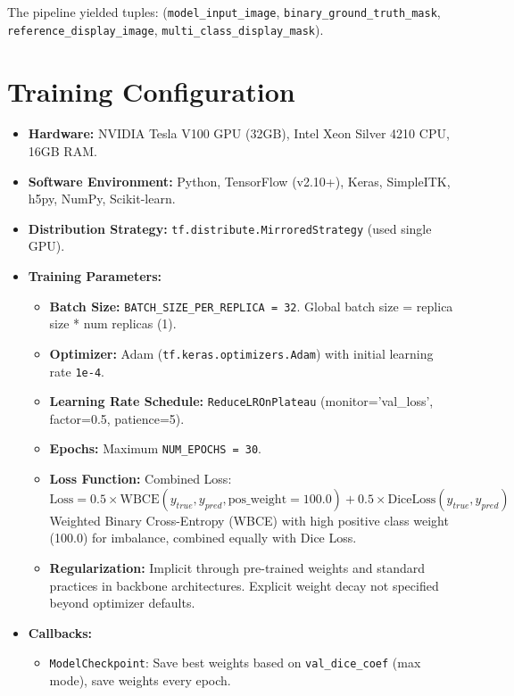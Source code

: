 The pipeline yielded tuples: (\texttt{model\_input\_image}, \texttt{binary\_ground\_truth\_mask}, \texttt{reference\_display\_image}, \texttt{multi\_class\_display\_mask}).

\section{Training Configuration}

\begin{itemize}
  \item \textbf{Hardware:} NVIDIA Tesla V100 GPU (32GB), Intel Xeon Silver 4210 CPU, 16GB RAM.
  \item \textbf{Software Environment:} Python, TensorFlow (v2.10+), Keras, SimpleITK, h5py, NumPy, Scikit-learn.
  \item \textbf{Distribution Strategy:} \texttt{tf.distribute.MirroredStrategy} (used single GPU).
  \item \textbf{Training Parameters:}
    \begin{itemize}
      \item \textbf{Batch Size:} \texttt{BATCH\_SIZE\_PER\_REPLICA = 32}. Global batch size = replica size * num replicas (1).
      \item \textbf{Optimizer:} Adam (\texttt{tf.keras.optimizers.Adam}) with initial learning rate \texttt{1e-4}.
      \item \textbf{Learning Rate Schedule:} \texttt{ReduceLROnPlateau} (monitor='val\_loss', factor=0.5, patience=5).
      \item \textbf{Epochs:} Maximum \texttt{NUM\_EPOCHS = 30}.
      \item \textbf{Loss Function:} Combined Loss:
        \begin{equation}
          \text{Loss} = 0.5 \times \text{WBCE}(y_{true}, y_{pred}, \text{pos\_weight}=100.0) + 0.5 \times \text{DiceLoss}(y_{true}, y_{pred})
        \end{equation}
        Weighted Binary Cross-Entropy (WBCE) with high positive class weight (100.0) for imbalance, combined equally with Dice Loss.
      \item \textbf{Regularization:} Implicit through pre-trained weights and standard practices in backbone architectures. Explicit weight decay not specified beyond optimizer defaults.
    \end{itemize}
  \item \textbf{Callbacks:}
    \begin{itemize}
      \item \texttt{ModelCheckpoint}: Save best weights based on \texttt{val\_dice\_coef} (max mode), save weights every epoch.

\end{itemize}
\end{itemize}
